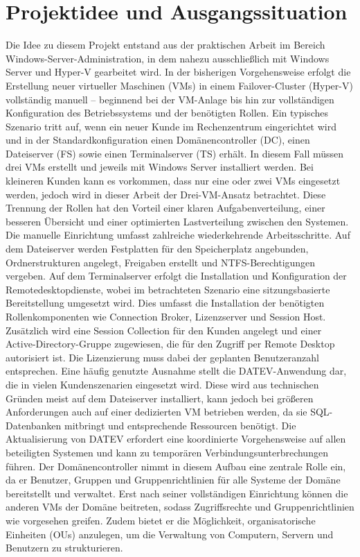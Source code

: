 \documentclass[conference]{IEEEtran}
\begin{document}
\section{Projektidee und Ausgangssituation}

Die Idee zu diesem Projekt entstand aus der praktischen Arbeit im Bereich Windows-Server-Administration, in dem nahezu ausschließlich mit Windows Server und Hyper-V gearbeitet wird.
In der bisherigen Vorgehensweise erfolgt die Erstellung neuer virtueller Maschinen (VMs) in einem Failover-Cluster (Hyper-V) vollständig manuell – beginnend bei der VM-Anlage bis hin zur vollständigen Konfiguration des Betriebssystems und der benötigten Rollen.
Ein typisches Szenario tritt auf, wenn ein neuer Kunde im Rechenzentrum eingerichtet wird und in der Standardkonfiguration einen Domänencontroller (DC), einen Dateiserver (FS) sowie einen Terminalserver (TS) erhält.
In diesem Fall müssen drei VMs erstellt und jeweils mit Windows Server installiert werden.
Bei kleineren Kunden kann es vorkommen, dass nur eine oder zwei VMs eingesetzt werden, jedoch wird in dieser Arbeit der Drei-VM-Ansatz betrachtet.
Diese Trennung der Rollen hat den Vorteil einer klaren Aufgabenverteilung, einer besseren Übersicht und einer optimierten Lastverteilung zwischen den Systemen.
Die manuelle Einrichtung umfasst zahlreiche wiederkehrende Arbeitsschritte.
Auf dem Dateiserver werden Festplatten für den Speicherplatz angebunden, Ordnerstrukturen angelegt, Freigaben erstellt und NTFS-Berechtigungen vergeben.
Auf dem Terminalserver erfolgt die Installation und Konfiguration der Remotedesktopdienste, wobei im betrachteten Szenario eine sitzungsbasierte Bereitstellung umgesetzt wird.
Dies umfasst die Installation der benötigten Rollenkomponenten wie Connection Broker, Lizenzserver und Session Host.
Zusätzlich wird eine Session Collection für den Kunden angelegt und einer Active-Directory-Gruppe zugewiesen, die für den Zugriff per Remote Desktop autorisiert ist.
Die Lizenzierung muss dabei der geplanten Benutzeranzahl entsprechen.
Eine häufig genutzte Ausnahme stellt die DATEV-Anwendung dar, die in vielen Kundenszenarien eingesetzt wird.
Diese wird aus technischen Gründen meist auf dem Dateiserver installiert, kann jedoch bei größeren Anforderungen auch auf einer dedizierten VM betrieben werden, da sie SQL-Datenbanken mitbringt und entsprechende Ressourcen benötigt.
Die Aktualisierung von DATEV erfordert eine koordinierte Vorgehensweise auf allen beteiligten Systemen und kann zu temporären Verbindungsunterbrechungen führen.
Der Domänencontroller nimmt in diesem Aufbau eine zentrale Rolle ein, da er Benutzer, Gruppen und Gruppenrichtlinien für alle Systeme der Domäne bereitstellt und verwaltet.
Erst nach seiner vollständigen Einrichtung können die anderen VMs der Domäne beitreten, sodass Zugriffsrechte und Gruppenrichtlinien wie vorgesehen greifen.
Zudem bietet er die Möglichkeit, organisatorische Einheiten (OUs) anzulegen, um die Verwaltung von Computern, Servern und Benutzern zu strukturieren.
\end{document}
